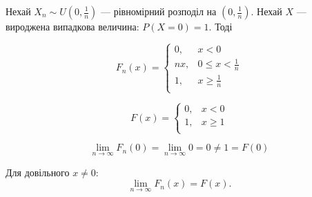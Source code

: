 \begin{example}
    Нехай $X_n \sim U(0, \frac{1}{n})$ --- рівномірний розподіл
    на $(0, \frac{1}{n})$.
    Нехай $X$ --- вироджена випадкова величина:
    $P(X = 0) = 1$.
    Тоді
    
    $$F_n(x) = \left\{ \begin{array}{ll}
        0, & x < 0 \\
        nx, & 0 \leqslant x < \frac{1}{n} \\
        1, & x \geqslant \frac{1}{n} \\
    \end{array} \right.$$
    
    $$F(x) = \left\{ \begin{array}{ll}
        0, & x < 0 \\
        1, & x \geqslant 1 \\
    \end{array} \right.$$
    
    \beautifulImage
    \beautifulImage
    \beautifulImage
    
    $$\lim\limits_{n \rightarrow \infty} F_n(0)
    = \lim\limits_{n \rightarrow \infty} 0
    = 0
    \neq 1
    = F(0)$$
    
    Для довільного $x \neq 0$:
    $$\lim\limits_{n \rightarrow \infty} F_n(x)
    = F(x).$$
\end{example}

